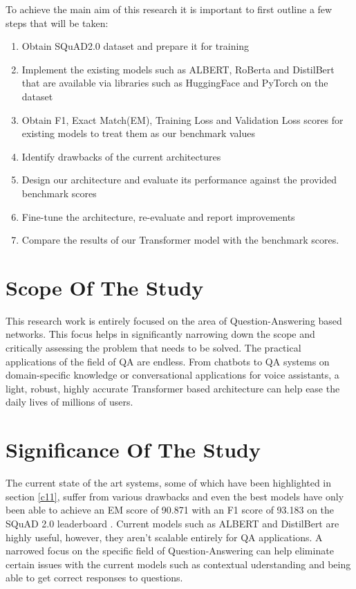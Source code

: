 \documentclass[a4paper,12pt]{report}
\begin{document}
        	To achieve the main aim of this research it  is important to first outline a few steps that will be taken:
        \begin{enumerate}
        	\item Obtain SQuAD2.0 dataset and prepare it for training
        	\item Implement the existing models such as ALBERT, RoBerta and DistilBert that are available via libraries such as HuggingFace \citep{hfTransformers} and PyTorch  on the dataset
        	\item Obtain F1, Exact Match(EM), Training Loss and Validation Loss scores for existing models to treat them as our benchmark values
        	\item Identify drawbacks of the current architectures
        	\item Design our architecture and evaluate its performance against the provided benchmark scores
        	\item Fine-tune the architecture, re-evaluate and report improvements
        	\item Compare the results of our Transformer model with the benchmark scores.
        \end{enumerate}

        \section{Scope Of The Study}\label{13}

        This research work is entirely focused on the area of Question-Answering based networks. This focus helps in significantly narrowing down the scope and critically assessing the problem that needs to be solved. The practical applications of the field of QA are endless. From chatbots to QA systems on domain-specific knowledge or conversational applications for voice assistants, a light, robust, highly accurate Transformer based architecture can help ease the daily lives of millions of users.

        \section{Significance Of The Study}\label{14}

        The current state of the art systems, some of which have been highlighted in section \ref{c11}, suffer from various drawbacks and even the best models have only been able to achieve an EM score of 90.871 with an F1 score of 93.183 on the SQuAD 2.0 leaderboard \citep{squad}. Current models such as ALBERT and DistilBert are highly useful, however, they aren't scalable entirely for QA applications. A narrowed focus on the specific field of Question-Answering can help eliminate certain issues with the current models such as contextual uderstanding and being able to get correct responses to questions.
\end{document}

